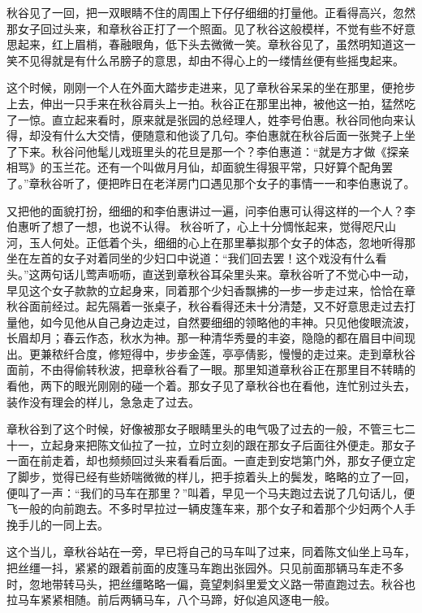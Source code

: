 \documentclass[12pt,UTF8]{ctexbook}
\begin{document}
{{{秋谷见了一回，把一双眼睛不住的周围上下仔仔细细的打量他。正看得高兴，忽然那女子回过头来，和章秋谷正打了一个照面。见了秋谷这般模样，不觉有些不好意思起来，红上眉梢，春融眼角，低下头去微微一笑。章秋谷见了，虽然明知道这一笑不见得就是有什么吊膀子的意思，却由不得心上的一缕情丝便有些摇曳起来。

这个时候，刚刚一个人在外面大踏步走进来，见了章秋谷呆呆的坐在那里，便抢步上去，伸出一只手来在秋谷肩头上一拍。秋谷正在那里出神，被他这一拍，猛然吃了一惊。直立起来看时，原来就是张园的总经理人，姓李号伯惠。秋谷同他向来认得，却没有什么大交情，便随意和他谈了几句。李伯惠就在秋谷后面一张凳子上坐了下来。秋谷问他髦儿戏班里头的花旦是那一个？李伯惠道：“就是方才做《探亲相骂》的玉兰花。还有一个叫做月月仙，却面貌生得狠平常，只好算个配角罢了。”章秋谷听了，便把昨日在老洋房门口遇见那个女子的事情一一和李伯惠说了。

又把他的面貌打扮，细细的和李伯惠讲过一遍，问李伯惠可认得这样的一个人？李伯惠听了想了一想，也说不认得。秋谷听了，心上十分惆怅起来，觉得咫尺山河，玉人何处。正低着个头，细细的心上在那里摹拟那个女子的体态，忽地听得那坐在左首的女子对着同坐的少妇口中说道：“我们回去罢！这个戏没有什么看头。”这两句话儿莺声呖呖，直送到章秋谷耳朵里头来。章秋谷听了不觉心中一动，早见这个女子款款的立起身来，同着那个少妇香飘拂的一步一步走过来，恰恰在章秋谷面前经过。起先隔着一张桌子，秋谷看得还未十分清楚，又不好意思走过去打量他，如今见他从自己身边走过，自然要细细的领略他的丰神。只见他俊眼流波，长眉却月；春云作态，秋水为神。那一种清华秀曼的丰姿，隐隐的都在眉目中间现出。更兼秾纤合度，修短得中，步步金莲，亭亭倩影，慢慢的走过来。走到章秋谷面前，不由得偷转秋波，把章秋谷看了一眼。那里知道章秋谷正在那里目不转睛的看他，两下的眼光刚刚的碰一个着。那女子见了章秋谷也在看他，连忙别过头去，装作没有理会的样儿，急急走了过去。

章秋谷到了这个时候，好像被那女子眼睛里头的电气吸了过去的一般，不管三七二十一，立起身来把陈文仙拉了一拉，立时立刻的跟在那女子后面往外便走。那女子一面在前走着，却也频频回过头来看看后面。一直走到安垲第门外，那女子便立定了脚步，觉得已经有些娇喘微微的样儿，把手掠着头上的鬓发，略略的立了一回，便叫了一声：“我们的马车在那里？”叫着，早见一个马夫跑过去说了几句话儿，便飞一般的向前跑去。不多时早拉过一辆皮篷车来，那个女子和着那个少妇两个人手挽手儿的一同上去。

这个当儿，章秋谷站在一旁，早已将自己的马车叫了过来，同着陈文仙坐上马车，把丝缰一抖，紧紧的跟着前面的皮篷马车跑出张园外。只见前面那辆马车走不多时，忽地带转马头，把丝缰略略一偏，竟望刺斜里爱文义路一带直跑过去。秋谷也拉马车紧紧相随。前后两辆马车，八个马蹄，好似追风逐电一般。

}}}
\end{document}
